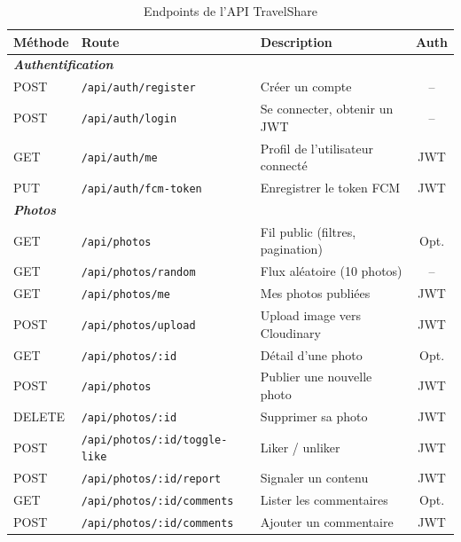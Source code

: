 \documentclass[12pt, a4paper, openany]{report}
\begin{document}
\begin{table}[H]
\centering
\caption{Endpoints de l'API TravelShare}
\renewcommand{\arraystretch}{1.3}
\begin{tabularx}{\textwidth}{llXc}
\toprule
\rowcolor{primary!20}
\textbf{Méthode} & \textbf{Route} & \textbf{Description} & \textbf{Auth} \\
\midrule
\multicolumn{4}{l}{\small\textit{\textbf{Authentification}}} \\
POST   & \texttt{/api/auth/register}         & Créer un compte                       & -- \\
POST   & \texttt{/api/auth/login}             & Se connecter, obtenir un JWT          & -- \\
GET    & \texttt{/api/auth/me}                & Profil de l'utilisateur connecté      & JWT \\
PUT    & \texttt{/api/auth/fcm-token}         & Enregistrer le token FCM              & JWT \\
\midrule
\multicolumn{4}{l}{\small\textit{\textbf{Photos}}} \\
GET    & \texttt{/api/photos}                 & Fil public (filtres, pagination)      & Opt. \\
GET    & \texttt{/api/photos/random}          & Flux aléatoire (10 photos)            & -- \\
GET    & \texttt{/api/photos/me}              & Mes photos publiées                   & JWT \\
POST   & \texttt{/api/photos/upload}          & Upload image vers Cloudinary          & JWT \\
GET    & \texttt{/api/photos/:id}             & Détail d'une photo                    & Opt. \\
POST   & \texttt{/api/photos}                 & Publier une nouvelle photo            & JWT \\
DELETE & \texttt{/api/photos/:id}             & Supprimer sa photo                    & JWT \\
POST   & \texttt{/api/photos/:id/toggle-like} & Liker / unliker                       & JWT \\
POST   & \texttt{/api/photos/:id/report}      & Signaler un contenu                   & JWT \\
GET    & \texttt{/api/photos/:id/comments}    & Lister les commentaires               & Opt. \\
POST   & \texttt{/api/photos/:id/comments}    & Ajouter un commentaire                & JWT \\

\end{tabularx}
\end{table}
\end{document}
